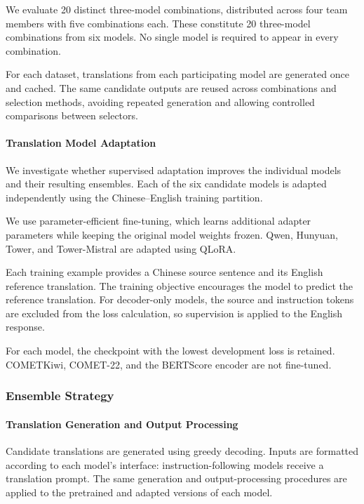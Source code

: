 \documentclass[11pt]{article}
\begin{document}
We evaluate 20 distinct three-model combinations, distributed across four team members with five combinations each. These constitute 20 three-model combinations from six models. No single model is required to appear in every combination.

For each dataset, translations from each participating model are generated once and cached. The same candidate outputs are reused across combinations and selection methods, avoiding repeated generation and allowing controlled comparisons between selectors.

\paragraph{Translation Model Adaptation}
We investigate whether supervised adaptation improves the individual models and their resulting ensembles. Each of the six candidate models is adapted independently using the Chinese--English training partition.

We use parameter-efficient fine-tuning, which learns additional adapter parameters while keeping the original model weights frozen. Qwen, Hunyuan, Tower, and Tower-Mistral are adapted using QLoRA.

Each training example provides a Chinese source sentence and its English reference translation. The training objective encourages the model to predict the reference translation. For decoder-only models, the source and instruction tokens are excluded from the loss calculation, so supervision is applied to the English response.

For each model, the checkpoint with the lowest development loss is retained. COMETKiwi, COMET-22, and the BERTScore encoder are not fine-tuned.
\subsubsection{Ensemble Strategy}
\label{subsubsec:ensemble_strategy}

\paragraph{Translation Generation and Output Processing}
\label{para:translation_and_output}
Candidate translations are generated using greedy decoding. Inputs are formatted according to each model's interface: instruction-following models receive a translation prompt. The same generation and output-processing procedures are applied to the pretrained and adapted versions of each model.
\end{document}
